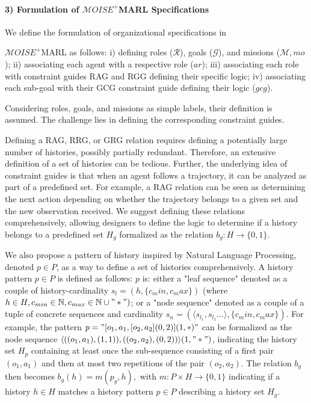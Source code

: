 \documentclass[sigconf,anonymous]{aamas}
\begin{document}
\paragraph{\textbf{3) Formulation of $\mathcal{M}OISE^+$MARL Specifications}} \quad

\noindent We define the formulation of organizational specifications in

\noindent $\mathcal{M}OISE^+$MARL as follows: \quad i) defining roles ($\mathcal{R}$), goals ($\mathcal{G}$), and missions ($\mathcal{M}, mo$); ii) associating each agent with a respective role ($ar$); \quad iii) associating each role with constraint guides RAG and RGG defining their specific logic; iv) associating each sub-goal with their GCG constraint guide defining their logic ($gcg$).

Considering roles, goals, and missions as simple labels, their definition is assumed. The challenge lies in defining the corresponding constraint guides.

Defining a RAG, RRG, or GRG relation requires defining a potentially large number of histories, possibly partially redundant. Therefore, an extensive definition of a set of histories can be tedious. Further, the underlying idea of constraint guides is that when an agent follows a trajectory, it can be analyzed as part of a predefined set. For example, a RAG relation can be seen as determining the next action depending on whether the trajectory belongs to a given set and the new observation received. We suggest defining these relations comprehensively, allowing designers to define the logic to determine if a history belongs to a predefined set $H_g$ formalized as the relation $b_g: H \to \{0,1\}$.

We also propose a pattern of history inspired by Natural Language Processing, denoted $p \in P$, as a way to define a set of histories comprehensively. A history pattern $p \in P$ is defined as follows: $p$ is: either a "leaf sequence" denoted as a couple of history-cardinality $s_l = (h, \{c_min,c_max\})$ (where $h \in H, c_{min} \in \mathbb{N}, c_{max} \in \mathbb{N} \cup "*")$; or a "node sequence" denoted as a couple of a tuple of concrete sequences and cardinality $s_n = (\langle s_{l_1}, s_{l_1}\dots \rangle, \{c_min,c_max\})$. For example, the pattern $p = \allowbreak "[o_1,a_1,[o_2,a_2](0,2)](1,*)"$ can be formalized as the node sequence $\allowbreak \langle ((o_1,a_1),(1,1)), ((o_2,a_2),(0,2))\rangle(1,"*")$, indicating the history set $H_p$ containing at least once the sub-sequence consisting of a first pair $(o_1,a_1)$ and then at most two repetitions of the pair $(o_2,a_2)$.
The relation $b_g$ then becomes $b_g(h) = m(p_g,h), \text{ with } m: P \times H \to \{0,1\}$ indicating if a history $h \in H$ matches a history pattern $p \in P$ describing a history set $H_g$.
\end{document}

